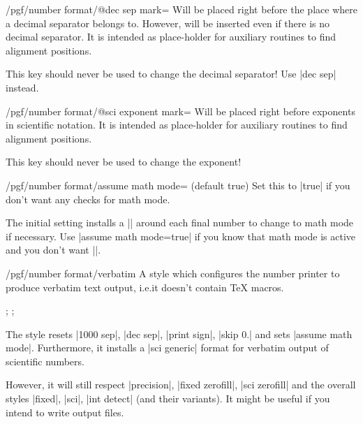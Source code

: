 \documentclass[a4paper]{ltxdoc}
\begin{document}
\begin{key}{/pgf/number format/@dec sep mark=}
    Will be placed right before the place where a decimal separator belongs to.
    However,  will be inserted even if there is no decimal
    separator. It is intended as place-holder for auxiliary routines to find
    alignment positions.

    This key should never be used to change the decimal separator! Use
    |dec sep| instead.
\end{key}

\begin{key}{/pgf/number format/@sci exponent mark=}
    Will be placed right before exponents in scientific notation. It is
    intended as place-holder for auxiliary routines to find alignment
    positions.

    This key should never be used to change the exponent!
\end{key}

\begin{key}{/pgf/number format/assume math mode= (default true)}
    Set this to |true| if you don't want any checks for math mode.

    The initial setting installs a |\pgfutilensuremath| around each final
    number to change to math mode if necessary. Use |assume math mode=true| if
    you know that math mode is active and you don't want |\pgfutilensuremath|.
\end{key}

\begin{stylekey}{/pgf/number format/verbatim}
    A style which configures the number printer to produce verbatim text
    output, i.e.\@ it doesn't contain \TeX{} macros.
\begin{codeexample}[]
;
;
\pgfmathprintnumber{\pgfmathresult}
\end{codeexample}
    The style resets |1000 sep|, |dec sep|, |print sign|, |skip 0.| and sets
    |assume math mode|. Furthermore, it installs a |sci generic| format for
    verbatim output of scientific numbers.

    However, it will still respect |precision|, |fixed zerofill|,
    |sci zerofill| and the overall styles |fixed|, |sci|, |int detect| (and
    their variants). It might be useful if you intend to write output files.
\end{stylekey}
\end{document}
